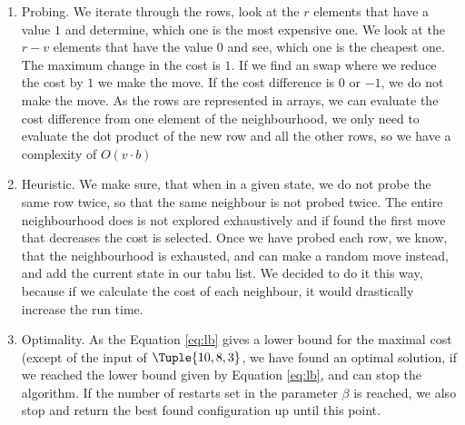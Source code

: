 \begin{enumerate}
\item Probing.  
We iterate through the rows, look at the $r$ elements that have a value $1$ and determine, which one is the most expensive one. We look at the $r-v$ elements that have the value $0$ and see, which one is the cheapest one. The maximum change in the \textsf{cost} is $1$. If we find an swap where we reduce the cost by $1$ we make the move. If the cost difference is $0$ or $-1$, we do not make the move.  
As the rows are represented in arrays, we can evaluate the cost difference from one element of the neighbourhood, we only need to evaluate the dot product of the new row and all the other rows, so we have a complexity of $O(v \cdot b)$
\item Heuristic. We make sure, that when in a given state, we do not probe the same row twice, so that the same neighbour is not probed twice. The entire neighbourhood does is not explored exhaustively and if found the first move that decreases the cost is selected. Once we have probed each row, we know, that the neighbourhood is exhausted, and can make a random move instead, and add the current state in our tabu list. We decided to do it this way, because if we calculate the cost of each neighbour, it would drastically increase the run time. 
\item Optimality. As the Equation \ref{eq:lb} gives a lower bound for the maximal cost (except of the input of $\Tuple{10, 8, 3}$, we have found an optimal solution, if we reached the lower bound given by Equation \ref{eq:lb}, and can stop the algorithm. If the number of restarts set in the parameter $\beta$ is reached, we also stop and return the best found configuration up until this point. 

\end{enumerate}
